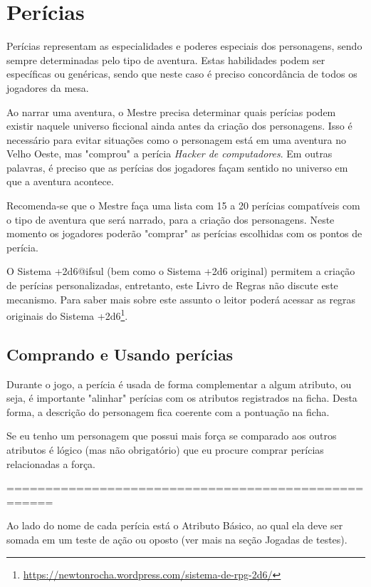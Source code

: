 \chapter{\label{ch:pericias}Perícias}

Perícias representam as especialidades e poderes especiais dos personagens, sendo sempre determinadas pelo tipo de aventura. Estas habilidades podem ser específicas ou genéricas, sendo que neste caso é preciso concordância de todos os jogadores da mesa.

Ao narrar uma aventura, o Mestre precisa determinar quais perícias podem existir naquele universo ficcional ainda antes da criação dos personagens. Isso é necessário para evitar situações como o personagem está em uma aventura no Velho Oeste, mas "comprou" a perícia \emph{Hacker de computadores}. Em outras palavras, é preciso que as perícias dos jogadores façam sentido no universo em que a aventura acontece. 

Recomenda-se que o Mestre faça uma lista com 15 a 20 perícias compatíveis com o tipo de aventura que será narrado, para a criação dos personagens. Neste momento os jogadores poderão "comprar" as perícias escolhidas com os pontos de perícia. 

O Sistema +2d6@ifsul (bem como o Sistema +2d6 original) permitem a criação de perícias personalizadas, entretanto, este Livro de Regras não discute este mecanismo. Para saber mais sobre este assunto o leitor poderá acessar as regras originais do Sistema +2d6\footnote{\url{https://newtonrocha.wordpress.com/sistema-de-rpg-2d6/}}.  

\section{\label{sec:usoPericia} Comprando e Usando perícias}
Durante o jogo, a perícia é usada de forma complementar a algum atributo, ou seja, é importante "alinhar" perícias com os atributos registrados na ficha. Desta forma, a descrição do personagem fica coerente com a pontuação na ficha.

Se eu tenho um personagem que possui mais força se comparado aos outros atributos é lógico (mas não obrigatório) que eu procure comprar perícias relacionadas a força.

\begin{center}
	====================================================
\end{center}

Ao lado do nome de cada perícia está o Atributo Básico, ao qual ela deve ser somada em um teste de ação ou oposto (ver mais na seção Jogadas de testes). 

